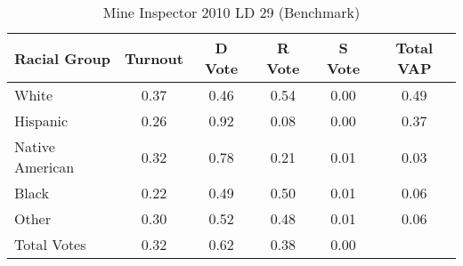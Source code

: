 \begin{table}[htb]
\begin{center}
\caption{Mine Inspector 2010 LD 29 (Benchmark)}
\label{smine_vap_ld_29_benchmark}
\begin{tabular}{lccccc}
  \hline
Racial Group & Turnout & D Vote & R Vote & S Vote & Total VAP \\ 
  \hline
White & 0.37 & 0.46 & 0.54 & 0.00 & 0.49 \\ 
  Hispanic & 0.26 & 0.92 & 0.08 & 0.00 & 0.37 \\ 
  Native American & 0.32 & 0.78 & 0.21 & 0.01 & 0.03 \\ 
  Black & 0.22 & 0.49 & 0.50 & 0.01 & 0.06 \\ 
  Other & 0.30 & 0.52 & 0.48 & 0.01 & 0.06 \\ 
  Total Votes & 0.32 & 0.62 & 0.38 & 0.00 &  \\ 
   \hline
\end{tabular}
\end{center}
\end{table}
